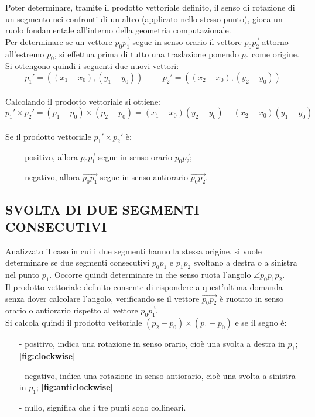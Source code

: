 \documentclass[12pt,a4paper]{report}
\begin{document}
Poter determinare, tramite il prodotto vettoriale definito, il senso di rotazione di un segmento nei confronti di un altro (applicato nello stesso punto), gioca un ruolo fondamentale all'interno della geometria computazionale.\\
Per determinare se un vettore $\overrightarrow{p_0p_1}$ segue in senso orario il vettore $\overrightarrow{p_0p_2}$ attorno all'estremo $p_0$, si effettua prima di tutto una traslazione ponendo $p_0$ come origine.\\
Si ottengono quindi i seguenti due nuovi vettori: 
\[ {p_1}' = ((x_1 - x_0),(y_1 - y_0))
\hspace{1cm}
{p_2}' = ((x_2 - x_0),(y_2 - y_0)) \]\\
Calcolando il prodotto vettoriale si ottiene:
\[{p_1}' \times {p_2}' = (p_1 - p_0) \times (p_2 - p_0) = (x_1 - x_0)(y_2 - y_0) - (x_2 - x_0)(y_1 - y_0)\]\\
Se il prodotto vettoriale ${p_1}' \times {p_2}'$ è:
\begin{itemize}
    \item[-] positivo, allora $\overrightarrow{p_0p_1}$ segue in senso orario $\overrightarrow{p_0p_2}$;
    \item[-] negativo, allora $\overrightarrow{p_0p_1}$ segue in senso antiorario $\overrightarrow{p_0p_2}$.
\end{itemize}

\pagebreak

\subsection*{\small{SVOLTA DI DUE SEGMENTI CONSECUTIVI}}
Analizzato il caso in cui i due segmenti hanno la stessa origine, si vuole determinare se due segmenti consecutivi $\overline{p_0p_1}$ e $\overline{p_1p_2}$ svoltano a destra o a sinistra nel punto $p_1$. Occorre quindi determinare in che senso ruota l'angolo $\angle p_0p_1p_2$.\\
Il prodotto vettoriale definito consente di rispondere a quest'ultima domanda senza dover calcolare l'angolo, verificando se il vettore $\overrightarrow{p_0p_2}$ è ruotato in senso orario o antiorario rispetto al vettore $\overrightarrow{p_0p_1}$.\\
Si calcola quindi il prodotto vettoriale $(p_2 - p_0) \times (p_1 - p_0)$ e se il segno è:
\begin{itemize}
    \item[-] positivo, indica una rotazione in senso orario, cioè una svolta a destra in $p_1$; \textbf{\ref{fig:clockwise}}
    \item[-] negativo, indica una rotazione in senso antiorario, cioè una svolta a sinistra in $p_1$; \textbf{\ref{fig:anticlockwise}}
    \item[-] nullo, significa che i tre punti sono collineari. 
\end{itemize}
\end{document}
